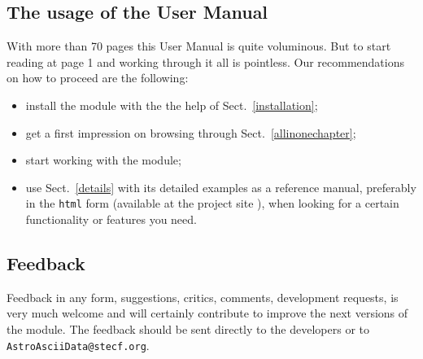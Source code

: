 \subsection{The usage of the User Manual}
\label{manualusage}
With more than 70 pages this User Manual is quite voluminous. But to start
reading at page 1 and working through it all is pointless. Our
recommendations on how to proceed are the following:
\begin{itemize}
  \item install the module with the the help of Sect.\ \ref{installation};
  \item get a first impression on \AAD browsing through Sect.\
  \ref{allinonechapter};
  \item start working with the module;
  \item use Sect.\ \ref{details} with its
  detailed examples as a reference manual, preferably in
  the {\tt html} form (available at the\index{project site}
  project site
  ), when looking for a certain functionality or features you need.
\end{itemize}
\subsection{Feedback}
\label{feedback}
Feedback in any form, suggestions,
critics, comments, development requests, is very much welcome and will
certainly contribute to improve the next versions of the module.
The feedback should be sent directly to the developers or to\newline
{\tt AstroAsciiData@stecf.org}.
